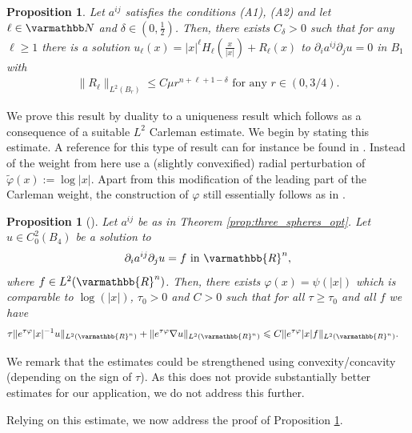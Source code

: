 \documentclass[12pt,twoside]{amsart}
\numberwithin{equation}{section}
\renewcommand{\leq}{\leqslant}
\renewcommand{\geq}{\geqslant}
\renewcommand{\mathbb}{\varmathbb}
\newtheorem{proposition}[theorem]{Proposition}
\newcommand {\R} {\mathbb{R}} \newcommand {\Z} {\mathbb{Z}}
\newcommand {\p} {\partial}
\begin{document}
\begin{appendix}
\begin{proposition}
\label{prop:existence}
Let $a^{ij}$ satisfies the conditions (A1), (A2) and let $\ell \in \N$ and $\delta \in (0,\frac{1}{2})$. Then, there exists $C_{\delta}>0$ such that for any $\ell \geq 1$ there is a solution $u_{\ell}(x) = |x|^{\ell} H_{\ell}(\frac{x}{|x|}) + R_{\ell}(x)$ to $\p_i a^{ij} \p_j u = 0$ in $B_{1}$ with
\begin{align*}
\|R_{\ell}\|_{L^2(B_r)} \leq C \mu r^{n + \ell + 1-\delta} \mbox{ for any } r \in (0,3/4).
\end{align*}
\end{proposition}

We prove this result by duality to a uniqueness result which follows as a consequence of a suitable $L^2$ Carleman estimate. We begin by stating this estimate. A reference for this type of result can for instance be found in \cite[Theorem 5]{KochTataru01}. Instead of the weight from \cite[Section 6]{KochTataru01} here use a (slightly convexified) radial perturbation of $\tilde{\varphi}(x):=\log|x|$.  Apart from this modification of the leading part of the Carleman weight, the construction of $\varphi$ still essentially follows as in \cite[Lemma 6.1]{KochTataru01}.

\begin{proposition}[\cite{KochTataru01}]
\label{prop:Carl_three_balls}
Let $a^{ij}$ be as in Theorem \ref{prop:three_spheres_opt}. Let $u \in C^{2}_0(B_4)$ be a solution to
\begin{align*}
\p_i a^{ij} \p_j u = f  \mbox{ in } \R^n,
\end{align*}
where $f\in L^2(\R^n)$.
Then, there exists $\varphi(x)=\psi(|x|)$ which is comparable to $\log(|x|)$,
$\tau_0>0$ and $C>0$ such that for all $\tau \geq \tau_0$ and all $f$
we have
\begin{align}
\label{eq:Carl}
\begin{split}
&\tau \|e^{\tau \varphi}|x|^{-1}  u\|_{L^2(\R^n)} +  \|e^{\tau \varphi} \nabla u\|_{L^2(\R^n)}
\leq C  \|e^{\tau \varphi}|x| f \|_{L^2(\R^n)}.
\end{split}
\end{align}
\end{proposition}

We remark that the estimates could be strengthened using convexity/concavity (depending on the sign of $\tau$). As this does not provide substantially better estimates for our application, we do not address this further.

Relying on this estimate, we now address the proof of Proposition \ref{prop:existence}.


\end{appendix}
\end{document}
